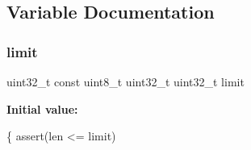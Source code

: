 \subsection{Variable Documentation}
\mbox{\label{memcmplen_8h_ad688ce47095cb0d331ea6e281ec62c27}} 
\subsubsection{limit}
{\footnotesize\ttfamily uint32\+\_\+t const uint8\+\_\+t uint32\+\_\+t uint32\+\_\+t limit}

{\bfseries Initial value\+:}
\begin{DoxyCode}
\{
        assert(len <= limit)
\end{DoxyCode}
